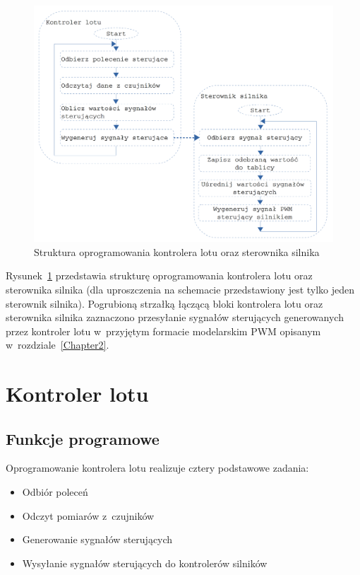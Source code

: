 \documentclass[11pt, twoside]{Thesis} %
\begin{document}
\begin{figure}[H]
	\centering
	\includegraphics[width=1\textwidth]{Pictures/Struktura_oprogramowania.png}
		\caption[Struktura oprogramowania kontrolera lotu oraz sterownika silnika]{Struktura oprogramowania kontrolera lotu oraz sterownika silnika}
	\label{fig:struktura_oprogramowania}
\end{figure}

Rysunek~\ref{fig:struktura_oprogramowania} przedstawia strukturę oprogramowania kontrolera lotu oraz sterownika silnika (dla uproszczenia na schemacie przedstawiony jest tylko jeden sterownik silnika). Pogrubioną strzałką łączącą bloki kontrolera lotu oraz sterownika silnika zaznaczono przesyłanie sygnałów sterujących generowanych przez kontroler lotu w~przyjętym formacie modelarskim PWM opisanym w~rozdziale~\ref{Chapter2}.

\section{Kontroler lotu}

\subsection{Funkcje programowe}

Oprogramowanie kontrolera lotu realizuje cztery podstawowe zadania:

\begin{itemize}
	\item Odbiór poleceń 
	\item Odczyt pomiarów z~czujników
	\item Generowanie sygnałów sterujących 
	\item Wysyłanie sygnałów sterujących do kontrolerów silników
\end{itemize}
\end{document}
